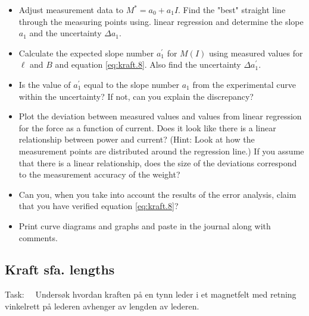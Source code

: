\documentclass[../Elmag-labhefte-2020.tex]{subfiles}
\begin{document}
\vspace{-4mm}
\begin{itemize}
    \item Adjust measurement data to $M^\ast = a_0 + a_1 I$. Find the "best" straight line through the measuring points using. linear regression and determine the slope $a_1$ and the uncertainty $\Delta a_1$.
    \item Calculate the expected slope number $a_1^\prime$ for $M(I)$ using measured values   for $\ell$ and $B$ and equation \eqref{eq:kraft.8}. Also find the uncertainty $\Delta a_1^\prime$.
    \item Is the value of $a_1^\prime$ equal to the slope number $a_1$ from the experimental curve within the uncertainty? If not, can you explain the discrepancy?
    \item Plot the deviation between measured values   and values   from linear regression for the force as a function of current. Does it look like there is a linear relationship between power and current? (Hint: Look at how the measurement points are distributed around the regression line.) If you assume that there is a linear relationship, does the size of the deviations correspond to the measurement accuracy of the weight? %
    \item Can you, when you take into account the results of the error analysis, claim that you have verified equation \eqref{eq:kraft.8}?
    \item Print curve diagrams and graphs and paste in the journal along with comments.
\end{itemize}

\subsection{Kraft sfa. lengths \label{ch.kraft.lengde}}

Task: \ \
{\itsf Undersøk hvordan kraften på en tynn leder i et magnetfelt med retning vinkelrett på lederen avhenger av lengden av lederen.}
\end{document}
